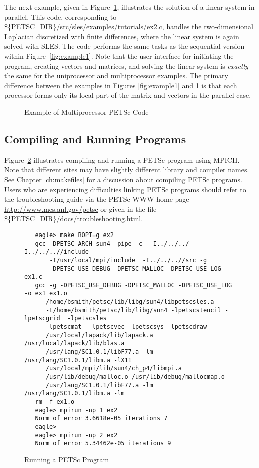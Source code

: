 The next example, given in Figure~\ref{fig:example2}, illustrates the
solution of a linear system in parallel.  This code, corresponding to
\url{${PETSC_DIR}/src/sles/examples/tutorials/ex2.c}, handles the
two-dimensional Laplacian discretized with finite differences, where
the linear system is again solved with SLES.  The code performs the
same tasks as the sequential version within Figure~\ref{fig:example1}.
Note that the user interface for initiating the program, creating
vectors and matrices, and solving the linear system is {\em exactly}
the same for the uniprocessor and multiprocessor examples.  The
primary difference between the examples in Figures \ref{fig:example1}
and \ref{fig:example2} is that each processor forms only its local
part of the matrix and vectors in the parallel case.

\begin{figure}[H]
{\footnotesize
{}
}
\nobreak
\caption{Example of Multiprocessor PETSc Code}
\label{fig:example2}
\end{figure}

\subsection*{Compiling and Running Programs}

Figure~\ref{fig:exrun} illustrates compiling and running a PETSc program
using MPICH.  Note that different sites may have slightly different
library and compiler names.  See Chapter \ref{ch:makefiles}
for a discussion about compiling PETSc programs.
Users who are experiencing difficulties linking PETSc programs should 
refer to the troubleshooting guide via the PETSc WWW home page 
\url{http://www.mcs.anl.gov/petsc} or
given in the file \url{${PETSC_DIR}/docs/troubleshooting.html}.

\begin{figure}[H]
{\small
\begin{verbatim}
   eagle> make BOPT=g ex2
   gcc -DPETSC_ARCH_sun4 -pipe -c  -I../../../  -I../../..//include   
       -I/usr/local/mpi/include  -I../../..//src -g 
       -DPETSC_USE_DEBUG -DPETSC_MALLOC -DPETSC_USE_LOG ex1.c
   gcc -g -DPETSC_USE_DEBUG -DPETSC_MALLOC -DPETSC_USE_LOG -o ex1 ex1.o 
      /home/bsmith/petsc/lib/libg/sun4/libpetscsles.a 
      -L/home/bsmith/petsc/lib/libg/sun4 -lpetscstencil -lpetscgrid  -lpetscsles 
      -lpetscmat  -lpetscvec -lpetscsys -lpetscdraw  
      /usr/local/lapack/lib/lapack.a /usr/local/lapack/lib/blas.a 
      /usr/lang/SC1.0.1/libF77.a -lm /usr/lang/SC1.0.1/libm.a -lX11 
      /usr/local/mpi/lib/sun4/ch_p4/libmpi.a
      /usr/lib/debug/malloc.o /usr/lib/debug/mallocmap.o  
      /usr/lang/SC1.0.1/libF77.a -lm /usr/lang/SC1.0.1/libm.a -lm
   rm -f ex1.o
   eagle> mpirun -np 1 ex2
   Norm of error 3.6618e-05 iterations 7
   eagle>
   eagle> mpirun -np 2 ex2
   Norm of error 5.34462e-05 iterations 9
\end{verbatim}
}
\nobreak
\caption{Running a PETSc Program}
\label{fig:exrun}
\end{figure}

